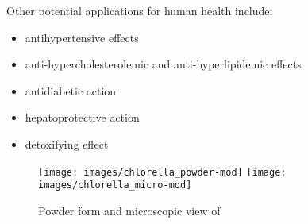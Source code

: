 Other potential applications for human health include:
\begin{itemize}
\item antihypertensive effects
\item anti-hypercholesterolemic and anti-hyperlipidemic effects
\item antidiabetic action
\item hepatoprotective action
\item detoxifying effect~\parencite{bito_Potential_2020}
\end{itemize}

\begin{figure}[H]
\centering
	\subcaptionbox*{\label{subfig:chlorella_powder}}%
		{\texttt{[image: images/chlorella\_powder-mod]}}%
\hfill%
	\subcaptionbox*{\label{subfig:chlorella_micro}}%
		{\texttt{[image: images/chlorella\_micro-mod]}}%
\caption{Powder form and microscopic view of }%
\label{fig:chlorella_views}
\end{figure}

